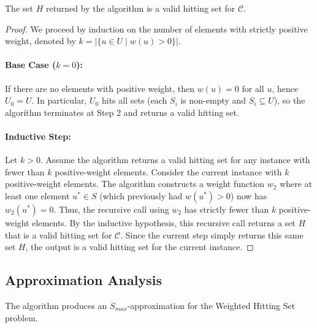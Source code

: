 \begin{lemma}
The set $H$ returned by the algorithm is a valid hitting set for $\mathcal{C}$.
\end{lemma}

\begin{proof}
We proceed by induction on the number of elements with strictly positive weight, denoted by $k = |\{u \in U \mid w(u) > 0\}|$.

\paragraph{Base Case ($k=0$):}
If there are no elements with positive weight, then $w(u) = 0$ for all $u$, hence $U_0 = U$. In particular, $U_0$ hits all sets (each $S_i$ is non-empty and $S_i \subseteq U$), so the algorithm terminates at Step 2 and returns a valid hitting set.

\paragraph{Inductive Step:}
Let $k > 0$. Assume the algorithm returns a valid hitting set for any instance with fewer than $k$ positive-weight elements.
Consider the current instance with $k$ positive-weight elements. The algorithm constructs a weight function $w_2$ where at least one element $u^* \in S$ (which previously had $w(u^*) > 0$) now has $w_2(u^*) = 0$.
Thus, the recursive call using $w_2$ has strictly fewer than $k$ positive-weight elements.
By the inductive hypothesis, this recursive call returns a set $H$ that is a valid hitting set for $\mathcal{C}$.
Since the current step simply returns this same set $H$, the output is a valid hitting set for the current instance.
\end{proof}

\subsection*{Approximation Analysis}

\begin{theorem}
The algorithm produces an $S_{max}$-approximation for the Weighted Hitting Set problem.
\end{theorem}


